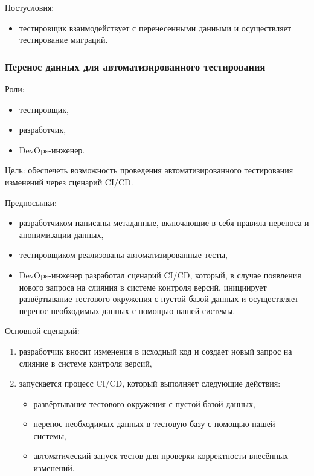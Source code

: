 Постусловия:

\begin{itemize}
    \item тестировщик взаимодействует с перенесенными данными и осуществляет тестирование миграций.
\end{itemize}


\subsubsection{Перенос данных для автоматизированного тестирования}

Роли:

\begin{itemize}
    \item тестировщик,
    \item разработчик,
    \item DevOps-инженер.
\end{itemize}

Цель: обеспечеть возможность проведения автоматизированного тестирования изменений через сценарий CI/CD.

Предпосылки:

\begin{itemize}
    \item разработчиком написаны метаданные, включающие в себя правила переноса и анонимизации данных,
    \item тестировщиком реализованы автоматизированные тесты,
    \item DevOps-инженер разработал сценарий CI/CD, который, в случае появления нового запроса на слияния в системе контроля версий, инициирует развёртывание тестового окружения с пустой базой данных и осуществляет перенос необходимых данных с помощью нашей системы.
\end{itemize}

Основной сценарий:

\begin{enumerate}
    \item разработчик вносит изменения в исходный код и создает новый запрос на слияние в системе контроля версий,
    \item запускается процесс CI/CD, который выполняет следующие действия:
    \begin{itemize}
        \item развёртывание тестового окружения с пустой базой данных,
        \item перенос необходимых данных в тестовую базу с помощью нашей системы,
        \item автоматический запуск тестов для проверки корректности внесённых изменений.
    \end{itemize}
\end{enumerate}



